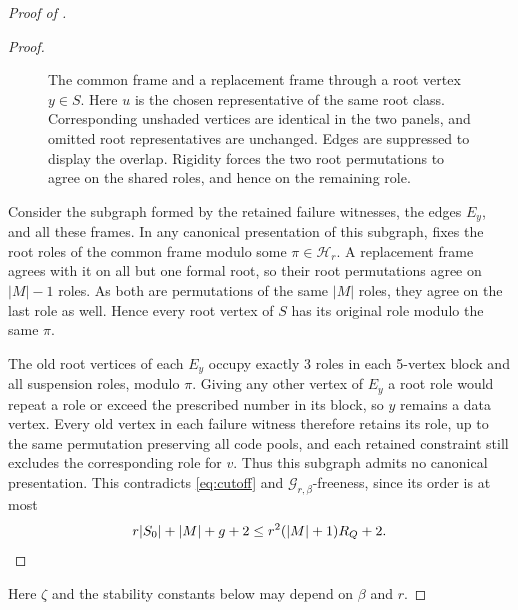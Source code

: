 \documentclass[10pt]{article}
\numberwithin{equation}{section}
\theoremstyle{definition}
\newcommand{\cG}{\mathcal G}\newcommand{\cH}{\mathcal H}\newcommand{\cJ}{\mathcal J}
\begin{document}
\begin{proof}[Proof of ]
\begin{proof}
\begin{figure}[htbp]
\centering
{}
\caption{The common frame and a replacement frame through a root vertex $y\in S$. Here $u$ is the chosen representative of the same root class. Corresponding unshaded vertices are identical in the two panels, and omitted root representatives are unchanged. Edges are suppressed to display the overlap. Rigidity forces the two root permutations to agree on the shared roles, and hence on the remaining role.}
\label{fig:replacementframe}
\end{figure}

Consider the subgraph formed by the retained failure witnesses, the edges $E_y$, and all these frames. In any canonical presentation of this subgraph,  fixes the root roles of the common frame modulo some $\pi\in\mathscr H_r$. A replacement frame agrees with it on all but one formal root, so their root permutations agree on $|M|-1$ roles. As both are permutations of the same $|M|$ roles, they agree on the last role as well. Hence every root vertex of $S$ has its original role modulo the same $\pi$.

The old root vertices of each $E_y$ occupy exactly 3 roles in each 5-vertex block and all suspension roles, modulo $\pi$. Giving any other vertex of $E_y$ a root role would repeat a role or exceed the prescribed number in its block, so $y$ remains a data vertex. Every old vertex in each failure witness therefore retains its role, up to the same permutation preserving all code pools, and each retained constraint still excludes the corresponding role for $v$. Thus this subgraph admits no canonical presentation. This contradicts \eqref{eq:cutoff} and $\cG_{r,\beta}$-freeness, since its order is at most
\[
 r|S_0|+|M|+g+2\le r^2(|M|+1)R_Q+2.\qedhere
\]
\end{proof}
Here $\zeta$ and the stability constants below may depend on $\beta$ and $r$.


\end{proof}
\end{document}
